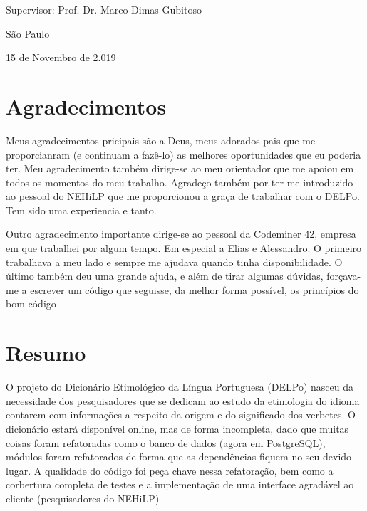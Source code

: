 \documentclass[12pt,twoside,a4paper,openany]{book}
\begin{document}
    \begin{center}
        Supervisor: Prof. Dr. Marco Dimas Gubitoso

        \vskip 5cm
        \normalsize{São Paulo}

        \normalsize{15 de Novembro de 2.019}
    \end{center}
    \pagebreak





    \chapter*{Agradecimentos}

    Meus agradecimentos pricipais são a Deus, meus adorados pais que me proporcianram
    (e continuam a fazê-lo) as melhores oportunidades que eu poderia ter. Meu
    agradecimento também dirige-se ao meu orientador que me apoiou em todos os momentos
    do meu trabalho. Agradeço também por ter me introduzido ao pessoal do NEHiLP que
    me proporcionou a graça de trabalhar com o DELPo. Tem sido uma experiencia e tanto.

    Outro agradecimento importante dirige-se ao pessoal da Codeminer 42, empresa em que
    trabalhei por algum tempo. Em especial a Elias e Alessandro. O primeiro trabalhava
    a meu lado e sempre me ajudava quando tinha disponibilidade. O último também deu
    uma grande ajuda, e além de tirar algumas dúvidas, forçava-me a escrever um código
    que seguisse, da melhor forma possível, os princípios do bom código


    \chapter*{Resumo}

    O projeto do Dicionário Etimológico da Língua Portuguesa (DELPo) nasceu da necessidade
    dos pesquisadores que se dedicam ao estudo da etimologia do idioma contarem com
    informações a respeito da origem e do significado dos verbetes. O dicionário estará
    disponível online, mas de forma incompleta, dado que muitas coisas foram refatoradas
    como o banco de dados (agora em PostgreSQL), módulos foram refatorados de forma que as
    dependências fiquem no seu devido lugar. A qualidade do código foi peça chave nessa
    refatoração, bem como a corbertura completa de testes e a implementação de uma interface
    agradável ao cliente (pesquisadores do NEHiLP)
\end{document}
